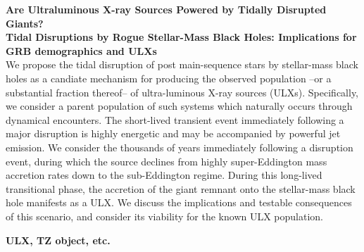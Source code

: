 {\bf Are Ultraluminous X-ray Sources Powered by Tidally Disrupted Giants? \\ Tidal Disruptions by Rogue Stellar-Mass Black Holes:  Implications for GRB demographics and ULXs}\\

We propose the tidal disruption of post main-sequence stars by stellar-mass black holes as a candiate mechanism for
producing the observed population --or a substantial fraction thereof-- of ultra-luminous X-ray sources (ULXs).   Specifically, we consider a parent population of such systems which naturally occurs through dynamical encounters.  The short-lived transient event immediately following a major disruption is highly energetic and may be 
accompanied by powerful jet emission.  We consider the thousands of years immediately following a disruption event, during which the source declines from highly super-Eddington mass accretion rates down to the sub-Eddington regime.  During this long-lived transitional phase, the accretion of the giant remnant onto the stellar-mass black hole manifests as a ULX.   We discuss the implications and testable consequences of this scenario, and consider its viability for the known ULX population.


{\bf ULX, TZ object, etc.}

